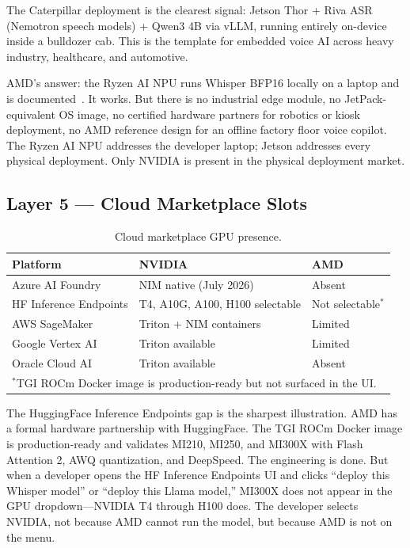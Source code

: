 \documentclass[blind]{gtac}
\begin{document}
The Caterpillar deployment is the clearest signal: Jetson Thor + Riva ASR (Nemotron speech models) + Qwen3 4B via vLLM, running entirely on-device inside a bulldozer cab. This is the template for embedded voice AI across heavy industry, healthcare, and automotive.

AMD's answer: the Ryzen AI NPU runs Whisper BFP16 locally on a laptop and is documented~\cite{amd_ryzen_whisper}. It works. But there is no industrial edge module, no JetPack-equivalent OS image, no certified hardware partners for robotics or kiosk deployment, no AMD reference design for an offline factory floor voice copilot. The Ryzen AI NPU addresses the developer laptop; Jetson addresses every physical deployment. Only NVIDIA is present in the physical deployment market.

\subsection{Layer 5 --- Cloud Marketplace Slots}

\begin{table}[H]
\centering
\caption{Cloud marketplace GPU presence.}
\label{tab:cloud}
\tiny
\begin{tabular}{@{}lll@{}}
\toprule
Platform & NVIDIA & AMD \\
\midrule
Azure AI Foundry & NIM native (July 2026) & Absent \\
HF Inference Endpoints & T4, A10G, A100, H100 selectable & Not selectable$^{*}$ \\
AWS SageMaker & Triton + NIM containers & Limited \\
Google Vertex AI & Triton available & Limited \\
Oracle Cloud AI & Triton available & Absent \\
\bottomrule
\multicolumn{3}{l}{$^{*}$TGI ROCm Docker image is production-ready but not surfaced in the UI.}
\end{tabular}
\end{table}

The HuggingFace Inference Endpoints gap is the sharpest illustration. AMD has a formal hardware partnership with HuggingFace. The TGI ROCm Docker image is production-ready and validates MI210, MI250, and MI300X with Flash Attention 2, AWQ quantization, and DeepSpeed. The engineering is done. But when a developer opens the HF Inference Endpoints UI and clicks ``deploy this Whisper model'' or ``deploy this Llama model,'' MI300X does not appear in the GPU dropdown---NVIDIA T4 through H100 does. The developer selects NVIDIA, not because AMD cannot run the model, but because AMD is not on the menu.
\end{document}
